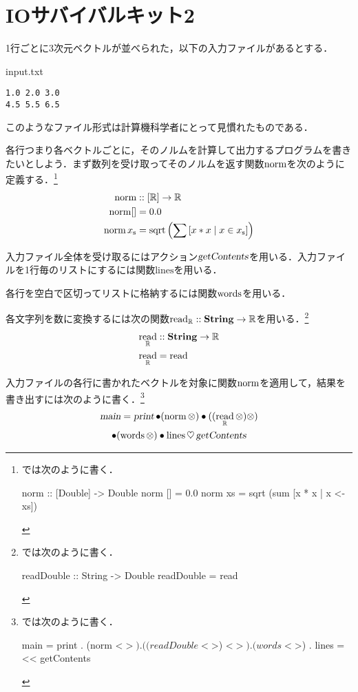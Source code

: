 \documentclass[platex,a5paper,twoside,fleqn,draft]{jsbook}
\begin{document}
\section{IOサバイバルキット2}

1行ごとに3次元ベクトルが並べられた，以下の入力ファイルがあるとする．
\begin{sourcecode}{input.txt}
\begin{verbatim}
1.0 2.0 3.0
4.5 5.5 6.5
\end{verbatim}
\end{sourcecode}
このようなファイル形式は計算機科学者にとって見慣れたものである．

各行つまり各ベクトルごとに，そのノルムを計算して出力するプログラムを書きたいとしよう．まず数列を受け取ってそのノルムを返す関数$\mathop{\textrm{norm}}$を次のように定義する．\footnote{\haskell では次のように書く．
\begin{footcode}
      norm :: [Double] -> Double
      norm [] = 0.0
      norm xs = sqrt (sum [x * x | x <- xs])
\end{footcode}}
\begin{align}
\mathop{\textrm{norm}}&::[\mathord{\mathbb{R}}]\rightarrow\mathord{\mathbb{R}}\\
\mathop{\textrm{norm}}[]&=0.0\\
\mathop{\textrm{norm}}{x}_\mathrm{s}&=\mathop{\textrm{sqrt}}\left(\sum\left[x*x\mid x\in{x}_\mathrm{s}\right]\right)
\end{align}

入力ファイル全体を受け取るにはアクション$\textsl{getContents}$を用いる．入力ファイルを1行毎のリストにするには関数$\textrm{lines}$を用いる．

各行を空白で区切ってリストに格納するには関数$\mathop{\textrm{words}}$を用いる．

各文字列を数に変換するには次の関数$\mathop{\textrm{read}}_{\mathord{\mathbb{R}}}::\mathbf{String}\rightarrow\mathord{\mathbb{R}}$を用いる．\footnote{\haskell では次のように書く．
\begin{footcode}
      readDouble :: String -> Double
      readDouble = read
\end{footcode}}
\begin{align}
\mathop{\textrm{read}}_{\mathord{\mathbb{R}}}&::\mathbf{String}\rightarrow\mathord{\mathbb{R}}\\
\mathop{\textrm{read}}_{\mathord{\mathbb{R}}}&=\mathop{\textrm{read}}
\end{align}

入力ファイルの各行に書かれたベクトルを対象に関数$\mathop{\textrm{norm}}$を適用して，結果を書き出すには次のように書く．\footnote{\haskell では次のように書く．
\begin{footcode}
      main = print 
        . (norm <$>) 
        . ((readDouble <$>) <$>) 
        . (words <$>) 
        . lines 
        =<< getContents
\end{footcode}}
\begin{multline}
\mathop{\textsl{main}}=\mathop{\textsl{print}}
\mathbin{\bullet}(\mathop{\textrm{norm}}\otimes)
\mathbin{\bullet}((\mathop{\textrm{read}}_{\mathord{\mathbb{R}}}\otimes)\otimes)\\
\mathbin{\bullet}(\mathop{\textrm{words}}\otimes)
\mathbin{\bullet}\mathop{\textrm{lines}}
\mathbin{\heartsuit}\mathop{\textsl{getContents}}
\end{multline}
\end{document}
